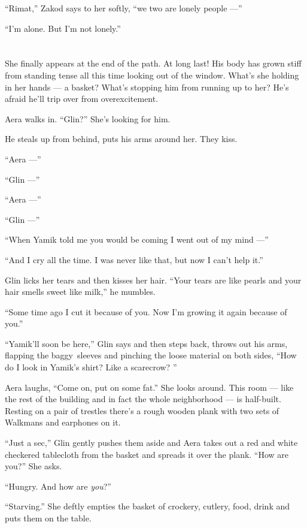 \documentclass[twoside,11pt]{book}
\begin{document}
``Rimat,'' Zakod says to her softly, ``we two are lonely people ---''

``I'm alone. But I'm not lonely.''


\chapter{}

She finally appears at the end of the path. At long last! His body has grown stiff from standing
tense{ }all this time looking out of the window. What's she holding in her
hands --- a basket? What's stopping him from running up to her?  He's afraid he'll trip over from overexcitement.

Aera walks in. ``Glin?'' She's looking for him.

He steals up from behind, puts his arms around her. They kiss.

``Aera ---''

``Glin ---''

``Aera ---''

``Glin ---''

``When Yamik told me you would be coming I went out of my mind ---''

``And I cry all the time. I was never like that, but now I can't help it.''

Glin licks her tears and then kisses her hair. ``Your tears are like pearls and your hair smells sweet
like milk,'' he mumbles.

``Some time ago I cut it because of you. Now I'm growing it again because of you.''

``Yamik'll soon be here,'' Glin says and then steps back, throws
out{ }his arms, flapping the baggy~sleeves and pinching the loose material on
both sides, ``How do I look in Yamik's shirt? Like a scarecrow? ''

Aera laughs, ``Come on, put on some fat.'' She looks around. This room ---  like the rest of
the building and in fact the whole neighborhood --- is half-built. Resting on
a pair of trestles there's a rough wooden plank with two sets of Walkmans and earphones on it.

``Just a sec,'' Glin gently pushes them aside and Aera takes out a red and white checkered
tablecloth from the basket and spreads it over the plank. ``How are you?'' She asks.

``Hungry. And how are \textit{you}?''

``Starving.'' She deftly empties the basket of crockery, cutlery, food, drink and puts them on
the table.
\end{document}
